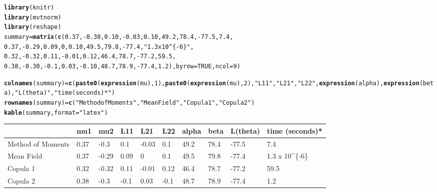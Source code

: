 \documentclass{article}\usepackage[]{graphicx}\usepackage[]{color}
\makeatletter
\newcommand{\hlnum}[1]{\textcolor[rgb]{0.686,0.059,0.569}{#1}}%
\newcommand{\hlstr}[1]{\textcolor[rgb]{0.192,0.494,0.8}{#1}}%
\newcommand{\hlopt}[1]{\textcolor[rgb]{0,0,0}{#1}}%
\newcommand{\hlstd}[1]{\textcolor[rgb]{0.345,0.345,0.345}{#1}}%
\newcommand{\hlkwb}[1]{\textcolor[rgb]{0.69,0.353,0.396}{#1}}%
\newcommand{\hlkwc}[1]{\textcolor[rgb]{0.333,0.667,0.333}{#1}}%
\newcommand{\hlkwd}[1]{\textcolor[rgb]{0.737,0.353,0.396}{\textbf{#1}}}%
\newenvironment{kframe}{%
 \def\at@end@of@kframe{}%
 \ifinner\ifhmode%
  \def\at@end@of@kframe{\end{minipage}}%
  \begin{minipage}{\columnwidth}%
 \fi\fi%
 \def\FrameCommand##1{\hskip\@totalleftmargin \hskip-\fboxsep
 \colorbox{shadecolor}{##1}\hskip-\fboxsep
     \hskip-\linewidth \hskip-\@totalleftmargin \hskip\columnwidth}%
 \MakeFramed {\advance\hsize-\width
   \@totalleftmargin\z@ \linewidth\hsize
   \@setminipage}}%
 {\par\unskip\endMakeFramed%
 \at@end@of@kframe}
\newenvironment{knitrout}{}{} %
\makeatother
\begin{document}
\begin{knitrout}
\color{fgcolor}\begin{kframe}
\begin{alltt}
\hlkwd{library}\hlstd{(knitr)}
\hlkwd{library}\hlstd{(mvtnorm)}
\hlkwd{library}\hlstd{(reshape)}
\hlstd{summary} \hlkwb{=} \hlkwd{matrix}\hlstd{(} \hlkwd{c}\hlstd{(}\hlnum{0.37}\hlstd{,} \hlopt{-}\hlnum{0.30}\hlstd{,} \hlnum{0.10}\hlstd{,} \hlopt{-}\hlnum{0.03}\hlstd{,} \hlnum{0.10}\hlstd{,} \hlnum{49.2}\hlstd{,} \hlnum{78.4}\hlstd{,} \hlopt{-}\hlnum{77.5}\hlstd{,} \hlnum{7.4}\hlstd{,}
                    \hlnum{0.37}\hlstd{,} \hlopt{-}\hlnum{0.29}\hlstd{,} \hlnum{0.09}\hlstd{,} \hlnum{0}\hlstd{,} \hlnum{0.10}\hlstd{,} \hlnum{49.5}\hlstd{,} \hlnum{79.8}\hlstd{,} \hlopt{-}\hlnum{77.4}\hlstd{,} \hlstr{"1.3 x 10^\{-6\}"}\hlstd{,}
                    \hlnum{0.32}\hlstd{,} \hlopt{-}\hlnum{0.32}\hlstd{,} \hlnum{0.11}\hlstd{,} \hlopt{-}\hlnum{0.01}\hlstd{,} \hlnum{0.12}\hlstd{,} \hlnum{46.4}\hlstd{,} \hlnum{78.7}\hlstd{,} \hlopt{-}\hlnum{77.2}\hlstd{,} \hlnum{59.5}\hlstd{,}
                    \hlnum{0.38}\hlstd{,} \hlopt{-}\hlnum{0.30}\hlstd{,} \hlopt{-}\hlnum{0.1}\hlstd{,} \hlnum{0.03}\hlstd{,} \hlopt{-}\hlnum{0.10}\hlstd{,} \hlnum{48.7}\hlstd{,} \hlnum{78.9}\hlstd{,} \hlopt{-}\hlnum{77.4}\hlstd{,} \hlnum{1.2}\hlstd{) ,} \hlkwc{byrow} \hlstd{=} \hlnum{TRUE}\hlstd{,} \hlkwc{ncol} \hlstd{=} \hlnum{9}\hlstd{)}

\hlkwd{colnames}\hlstd{(summary)} \hlkwb{=} \hlkwd{c}\hlstd{(}\hlkwd{paste0}\hlstd{(}\hlkwd{expression}\hlstd{(mu),} \hlnum{1}\hlstd{),} \hlkwd{paste0}\hlstd{(}\hlkwd{expression}\hlstd{(mu),} \hlnum{2}\hlstd{),} \hlstr{"L11"}\hlstd{,} \hlstr{"L21"}\hlstd{,} \hlstr{"L22"}\hlstd{,} \hlkwd{expression}\hlstd{(alpha),} \hlkwd{expression}\hlstd{(beta),} \hlstr{"L(theta)"}\hlstd{,} \hlstr{"time (seconds)*"}\hlstd{)}
\hlkwd{rownames}\hlstd{(summary)} \hlkwb{=} \hlkwd{c}\hlstd{(}\hlstr{"Method of Moments"}\hlstd{,} \hlstr{"Mean Field"}\hlstd{,} \hlstr{"Copula 1"}\hlstd{,} \hlstr{"Copula 2"}\hlstd{)}
\hlkwd{kable}\hlstd{(summary,} \hlkwc{format} \hlstd{=} \hlstr{"latex"}\hlstd{)}
\end{alltt}
\end{kframe}
\begin{tabular}{l|l|l|l|l|l|l|l|l|l}
\hline
  & mu1 & mu2 & L11 & L21 & L22 & alpha & beta & L(theta) & time (seconds)*\\
\hline
Method of Moments & 0.37 & -0.3 & 0.1 & -0.03 & 0.1 & 49.2 & 78.4 & -77.5 & 7.4\\
\hline
Mean Field & 0.37 & -0.29 & 0.09 & 0 & 0.1 & 49.5 & 79.8 & -77.4 & 1.3 x 10\textasciicircum{}\{-6\}\\
\hline
Copula 1 & 0.32 & -0.32 & 0.11 & -0.01 & 0.12 & 46.4 & 78.7 & -77.2 & 59.5\\
\hline
Copula 2 & 0.38 & -0.3 & -0.1 & 0.03 & -0.1 & 48.7 & 78.9 & -77.4 & 1.2\\
\hline
\end{tabular}


\end{knitrout}
\end{document}
